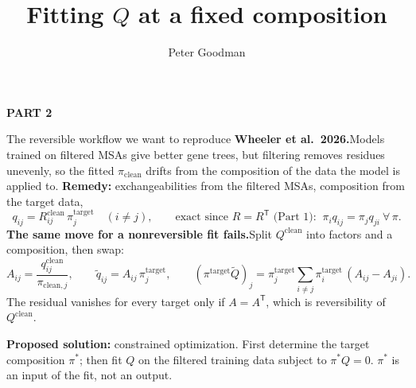 \documentclass[aspectratio=169,11pt]{beamer}
\title{Fitting \texorpdfstring{$Q$}{Q} at a fixed composition}
\author{Peter Goodman}
\institute{Masel Lab}
\date{}
\newcommand{\pis}{\pi^{\ast}}
\begin{document}
\begin{frame}[plain]
\vspace{5mm}
{\color{Accent}\small\bfseries PART 2\par}
\vspace{5mm}
{\inserttitle\par}
\vspace{7mm}

\vspace{12mm}
{\insertauthor\quad\textcolor{Muted}{\insertinstitute}\par}
\end{frame}

\begin{frame}{The reversible workflow we want to reproduce}
\small
\textbf{Wheeler et al.\ 2026.}\quad Models trained on filtered MSAs give better gene trees, but filtering
removes residues unevenly, so the fitted $\pi_{\mathrm{clean}}$ drifts from the composition of the data
the model is applied to. \textbf{Remedy:} exchangeabilities from the filtered MSAs, composition from the target data,
\[
 q_{ij}=R^{\mathrm{clean}}_{ij}\,\pi^{\mathrm{target}}_{j}\quad(i\ne j),
 \qquad\text{exact since $R=R^{\mathsf T}$ (Part 1): }\ \pi_iq_{ij}=\pi_jq_{ji}\ \forall\,\pi .
\]
\textbf{The same move for a nonreversible fit fails.}\quad Split $Q^{\mathrm{clean}}$ into factors and a composition, then swap:
\[
 A_{ij}=\frac{q^{\mathrm{clean}}_{ij}}{\pi_{\mathrm{clean},j}},\qquad
 \widetilde q_{ij}=A_{ij}\,\pi^{\mathrm{target}}_j,
 \qquad
 (\pi^{\mathrm{target}}\widetilde Q)_j=\pi^{\mathrm{target}}_j\sum_{i\ne j}\pi^{\mathrm{target}}_i\,(A_{ij}-A_{ji}) .
\]
The residual vanishes for every target only if $A=A^{\mathsf T}$, which is reversibility of $Q^{\mathrm{clean}}$.

\vspace{1mm}
\alert{\textbf{Proposed solution:} constrained optimization. First determine the target composition $\pis$;
then fit $Q$ on the filtered training data subject to $\pis Q=0$. $\pis$ is an input of the fit, not an output.}
\vspace{2mm}
\end{frame}
\end{document}
